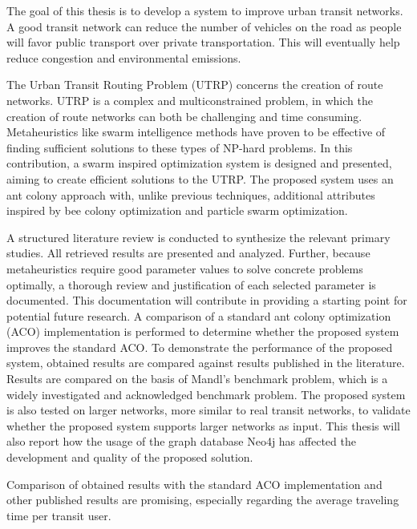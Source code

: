 

The goal of this thesis is to develop a system to improve urban transit networks. A good transit network can reduce the number of vehicles on the road as people will favor public transport over private transportation. This will eventually help reduce congestion and environmental emissions.%

The Urban Transit Routing Problem (UTRP) concerns the creation of route networks. UTRP is a complex and multiconstrained problem, in which the creation of route networks can both be challenging and time consuming. Metaheuristics like swarm intelligence methods have proven to be effective of finding sufficient solutions to these types of NP-hard problems. In this contribution, a swarm inspired optimization system is designed and presented, aiming to create efficient solutions to the UTRP. The proposed system uses an ant colony approach with, unlike previous techniques, additional attributes inspired by bee colony optimization and particle swarm optimization. 

A structured literature review is conducted to synthesize the relevant primary studies. All retrieved results are presented and analyzed. Further, because metaheuristics require good parameter values to solve concrete problems optimally, a thorough review and justification of each selected parameter is documented. This documentation will contribute in providing a starting point for potential future research. A comparison of a standard ant colony optimization (ACO) implementation is performed to determine whether the proposed system improves the standard ACO. To demonstrate the performance of the proposed system, obtained results are compared against results published in the literature. Results are compared on the basis of Mandl's benchmark problem, which is a widely investigated and acknowledged benchmark problem. The proposed system is also tested on larger networks, more similar to real transit networks, to validate whether the proposed system supports larger networks as input. This thesis will also report how the usage of the graph database Neo4j has affected the development and quality of the proposed solution.  

Comparison of obtained results with the standard ACO implementation and other published results are promising, especially regarding the average traveling time per transit user. 



